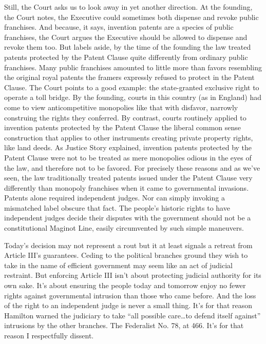 Still, the Court asks us to look away in yet another direction. At the founding,
the Court notes, the Executive could sometimes both dispense and revoke public
franchises. And because, it says, invention patents are a species of public
franchises, the Court argues the Executive should be allowed to dispense and
revoke them too. But labels aside, by the time of the founding the law treated
patents protected by the Patent Clause quite differently from ordinary public
franchises. Many public franchises amounted to little more than favors
resembling the original royal patents the framers expressly refused to protect
in the Patent Clause. The Court points to a good example: the state-granted
exclusive right to operate a toll bridge. By the founding, courts in this
country (as in England) had come to view anticompetitive monopolies like that
with disfavor, narrowly construing the rights they conferred. By contrast,
courts routinely applied to invention patents protected by the Patent Clause the
liberal common sense construction that applies to other instruments creating
private property rights, like land deeds. As Justice Story explained, invention
patents protected by the Patent Clause were not to be treated as mere monopolies
odious in the eyes of the law, and therefore not to be favored. For precisely
these reasons and as we've seen, the law traditionally treated patents issued
under the Patent Clause very differently than monopoly franchises when it came
to governmental invasions. Patents alone required independent judges. Nor can
simply invoking a mismatched label obscure that fact. The people's historic
rights to have independent judges decide their disputes with the government
should not be a constitutional Maginot Line, easily circumvented by such simple
maneuvers.

Today's decision may not represent a rout but it at least signals a retreat from
Article III's guarantees. Ceding to the political branches ground they wish to
take in the name of efficient government may seem like an act of judicial
restraint. But enforcing Article III isn't about protecting judicial authority
for its own sake. It's about ensuring the people today and tomorrow enjoy no
fewer rights against governmental intrusion than those who came before. And the
loss of the right to an independent judge is never a small thing. It's for that
reason Hamilton warned the judiciary to take ``all possible care\ldots to defend
itself against'' intrusions by the other branches. The Federalist No. 78, at
466. It's for that reason I respectfully dissent.

